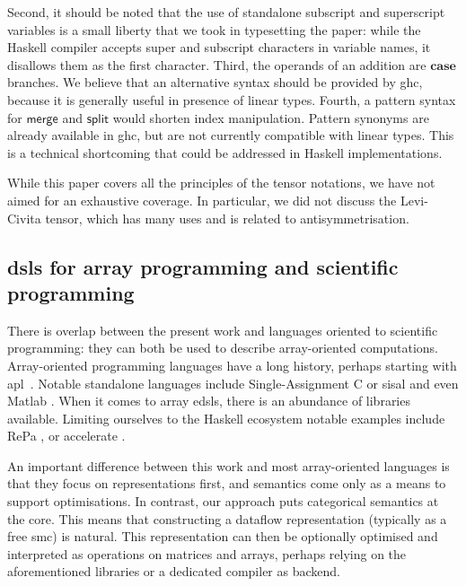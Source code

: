\documentclass[nolinenum]{jfp}
\begin{document}
Second,
it should be noted that the use of standalone subscript and
superscript variables is a small liberty that we took in
typesetting the paper: while the Haskell compiler accepts super and subscript characters in
variable names, it disallows them as the first character.  Third, the
operands of an addition are \(\mathbf{case}\) branches. We believe that an
alternative syntax should be provided by {\sc{}ghc}, because it
is generally useful in presence of linear types.  Fourth, a pattern
syntax for \(\mathsf{merge}\) and \(\mathsf{split}\) would shorten index
manipulation. Pattern synonyms are already available in
{\sc{}ghc}, but are not currently compatible with linear
types. This is a technical shortcoming that could be addressed in Haskell implementations.

While this paper covers all the principles of the tensor notations,
we have not aimed for an exhaustive coverage. In particular, we did not discuss the
Levi-Civita tensor, which has many uses and is related to antisymmetrisation.

\subsection{{\sc{}dsl}s for array programming and scientific programming}\label{379} 
There is overlap between the present work and languages oriented to
scientific programming: they can both be used to describe
array-oriented computations.  Array-oriented programming languages
have a long history, perhaps starting with
{\sc{}apl} \citep{iverson_programming_1962}. Notable standalone
languages include Single-Assignment C \citep{scholz_single_1994} or
{\sc{}sisal} \citep{feo_report_1990} and even Matlab \citep{gilat_matlab_2004}. When it comes to
array {\sc{}edsl}s, there is an abundance of libraries available.
Limiting ourselves to the Haskell ecosystem notable examples include
 RePa \citep{lippmeier_regular_2010}, or accelerate
\citep{chakravarty_accelerating_2011}.

An important difference between this work and most array-oriented
languages is that they focus on representations first, and semantics come
only as a means to support optimisations.  In contrast, our approach
puts categorical semantics at the core.  This means that
constructing a dataflow representation (typically as a free {\sc{}smc}) is
natural. This representation can then be optionally optimised and
interpreted as operations on matrices and arrays, perhaps relying
on the aforementioned libraries or a dedicated
compiler \citep{kjolstad_tensor_2017} as backend.
\end{document}
